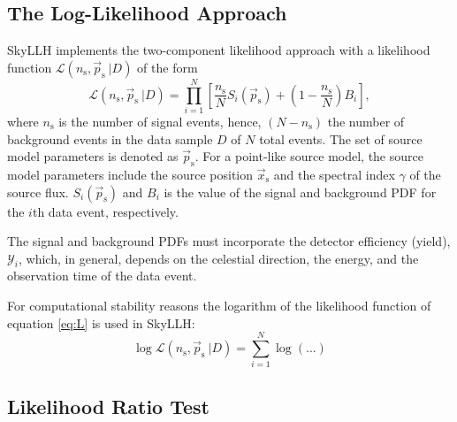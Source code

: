 \documentclass{article}
\newcommand{\ns}{n_{\mathrm{s}}}
\newcommand{\ps}{\vec{p}_{\mathrm{s}}}
\newcommand{\xs}{\vec{x}_{\mathrm{s}}}
\begin{document}
\subsection{The Log-Likelihood Approach}

SkyLLH implements the two-component likelihood approach with a likelihood
function $\mathcal{L}(n_{\mathrm{s}},\vec{p}_{\mathrm{s}}~|D)$ of the form
\begin{equation}
 \mathcal{L}(\ns,\ps~|D) = \prod_{i=1}^{N}\left[ \frac{\ns}{N} S_{i}(\ps) + (1 - \frac{\ns}{N}) B_{i} \right],
\label{eq:L}
\end{equation}
where $\ns$ is the number of signal events, hence, $(N-\ns)$ the number of
background events in the data sample $D$ of $N$ total events.
The set of source model parameters is denoted as $\ps$. For a point-like source
model, the source model parameters include the source position $\xs$ and the
spectral index $\gamma$ of the source flux.
$S_i(\ps)$ and $B_i$ is the value of the signal and background PDF for the $i$th
data event, respectively.

The signal and background PDFs must incorporate the detector efficiency (yield),
$\mathcal{Y}_i$, which, in general, depends on the celestial direction, the
energy, and the observation time of the data event.

For computational stability reasons the logarithm of the likelihood function of
equation \ref{eq:L} is used in SkyLLH:
\begin{equation}
 \log \mathcal{L}(\ns,\ps~|D) = \sum_{i=1}^{N} \log (...)
\end{equation}

\subsection{Likelihood Ratio Test}
\end{document}
